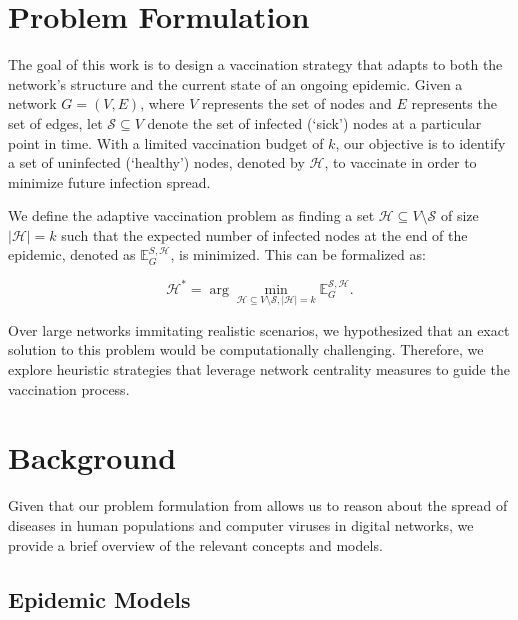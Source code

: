 \documentclass[9pt]{extarticle}
\begin{document}
\section{Problem Formulation}
\label{sec:problem_formulation}
\vspace{-0.1cm}

The goal of this work is to design a vaccination strategy that adapts to both the network's structure and the current state of an ongoing epidemic. Given a network $G = (V, E)$, where $V$ represents the set of nodes and $E$ represents the set of edges, let $\mathcal{S} \subseteq V$ denote the set of infected (`sick') nodes at a particular point in time. With a limited vaccination budget of $k$, our objective is to identify a set of uninfected (`healthy') nodes, denoted by $\mathcal{H}$, to vaccinate in order to minimize future infection spread.

We define the adaptive vaccination problem as finding a set $\mathcal{H} \subseteq V \setminus \mathcal{S}$ of size $|\mathcal{H}| = k$ such that the expected number of infected nodes at the end of the epidemic, denoted as $\mathbb{E}_{G}^{S, \mathcal{H}}$, is minimized. This can be formalized as:

\vspace{-0.3cm}
\begin{equation*}
    \mathcal{H}^* = \arg \min_{\mathcal{H} \subseteq V \setminus \mathcal{S}, |\mathcal{H}| = k} \mathbb{E}_{G}^{\mathcal{S}, \mathcal{H}}.
\end{equation*}
\vspace{-0.3cm}

Over large networks immitating realistic scenarios, we hypothesized that an exact solution to this problem would be computationally challenging. Therefore, we explore heuristic strategies that leverage network centrality measures to guide the vaccination process.

\section{Background}
\label{sec:background}
\vspace{-0.1cm}

Given that our problem formulation from  allows us to reason about the spread of diseases in human populations and computer viruses in digital networks, we provide a brief overview of the relevant concepts and models.

\subsection{Epidemic Models}
\label{sec:epidemic-models}
\vspace{-0.1cm}
\end{document}
